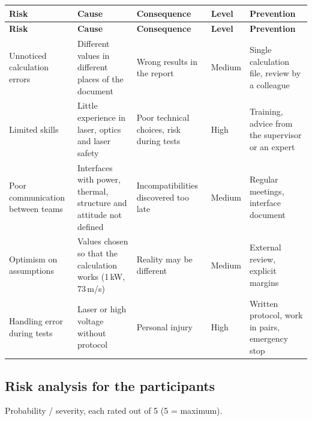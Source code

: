 \documentclass[11pt,a4paper]{article}
\newcommand{\risqueentete}{%
  \toprule
  \textbf{Risk} & \textbf{Cause} & \textbf{Consequence} & \textbf{Level} & \textbf{Prevention} \\
  \midrule
  \endfirsthead
  \toprule
  \textbf{Risk} & \textbf{Cause} & \textbf{Consequence} & \textbf{Level} & \textbf{Prevention} \\
  \midrule
  \endhead
  \bottomrule
  \endfoot
}
\begin{document}
\begin{longtable}{>{\raggedright\arraybackslash}p{3.7cm} >{\raggedright\arraybackslash}p{4.2cm} >{\raggedright\arraybackslash}p{3.7cm} >{\centering\arraybackslash}p{1.4cm} >{\raggedright\arraybackslash}p{4.0cm}}
\risqueentete
Unnoticed calculation errors & Different values in different places of the document & Wrong results in the report & Medium & Single calculation file, review by a colleague \\
Limited skills & Little experience in laser, optics and laser safety & Poor technical choices, risk during tests & High & Training, advice from the supervisor or an expert \\
Poor communication between teams & Interfaces with power, thermal, structure and attitude not defined & Incompatibilities discovered too late & Medium & Regular meetings, interface document \\
Optimism on assumptions & Values chosen so that the calculation works (1\,kW, 73\,m/s) & Reality may be different & Medium & External review, explicit margins \\
Handling error during tests & Laser or high voltage without protocol & Personal injury & High & Written protocol, work in pairs, emergency stop \\
\end{longtable}

\subsection{Risk analysis for the participants}

Probability / severity, each rated out of 5 (5 = maximum).
\end{document}

